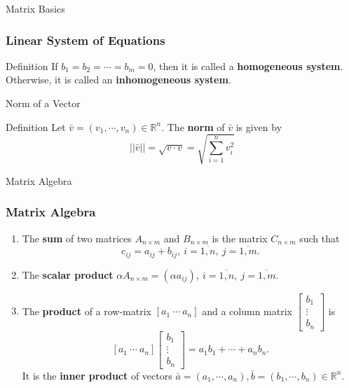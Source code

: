 \documentclass{beamer}
\begin{document}
\begin{section}{Matrix Basics}
\begin{frame}
    \frametitle{Linear System of Equations}
    \begin{block}{Definition}
        If $b_1 = b_2 = \cdots = b_m = 0$, then it is called a \textbf{homogeneous system}.\\
        Otherwise, it is called an \textbf{inhomogeneous system}.
    \end{block}
\end{frame}

\begin{frame}[label=2]{Norm of a Vector}
        \begin{block}{Definition}
        Let $\bar{v} = (v_1,\cdots,v_n) \in \mathbb{R}^n$. The \textbf{norm} of $\bar{v}$ is given by 
        \begin{equation*}
            ||\bar{v}|| = \sqrt{v \cdot v} = \sqrt{\sum\limits_{i=1}^{n} v_i^2}
        \end{equation*}
        \end{block}
\end{frame}
    
\begin{frame}[label=3]{Matrix Algebra}
        \frametitle{Matrix Algebra}
        \begin{enumerate}
            \item The \textbf{sum} of two matrices $A_{n\times m}$ and $B_{n \times m}$ is the matrix $C_{n \times m}$ such that 
            \begin{equation*}
                c_{ij} = a_{ij} + b_{ij}, \ i = \overline{1,n}, \ j = \overline{1,m}.
            \end{equation*}
            
            \item The \textbf{scalar product} $\alpha A_{n \times m}= (\alpha a_{ij}), \ i = \overline{1,n}, \ j = \overline{1,m}$. 
            
            \item The \textbf{product} of a row-matrix $\left[a_1 \ \cdots \ a_n \right]$ and a column matrix $\left[ \begin{array}{c} b_1 \\ \vdots \\ b_n \end{array}\right]$ is 
            \begin{equation*}
                \left[a_1 \ \cdots \ a_n \right] \left[ \begin{array}{c} b_1 \\ \vdots \\ b_n \end{array}\right] = a_1b_1 + \cdots + a_n b_n.
            \end{equation*}
            It is the \textbf{inner product} of vectors $\bar{a} = (a_1,\cdots,a_n), \bar{b} = (b_1,\cdots,b_n) \in \mathbb{R}^n$. 
        \end{enumerate}
    \end{frame}
    

\end{section}
\end{document}
